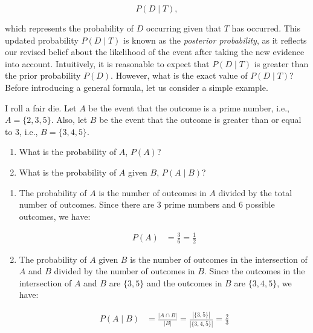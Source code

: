 \[
P(D \mid T),
\]

which represents the probability of \( D \) occurring given that \( T \) has occurred. This updated probability \( P(D \mid T) \) is known as the \textit{posterior probability}, as it reflects our revised belief about the likelihood of the event after taking the new evidence into account. Intuitively, it is reasonable to expect that \( P(D \mid T) \) is greater than the prior probability \( P(D) \). However, what is the exact value of \( P(D \mid T) \)? Before introducing a general formula, let us consider a simple example.

\begin{example}
I roll a fair die. Let \( A \) be the event that the outcome is a prime number, i.e., \( A = \{2, 3, 5\} \). Also, let \( B \) be the event that the outcome is greater than or equal to 3, i.e., \( B = \{3, 4, 5\} \).

\begin{enumerate}[label=(\alph*)]
    \item What is the probability of \( A \), \( P(A) \)?
    \item What is the probability of \( A \) given \( B \), \( P(A \mid B) \)?
\end{enumerate}

\end{example}

\begin{solution}
    \begin{enumerate}[label=(\alph*)]
        \item The probability of \( A \) is the number of outcomes in \( A \) divided by the total number of outcomes. Since there are 3 prime numbers and 6 possible outcomes, we have:

        \begin{align*}
        P(A) &= \frac{3}{6} = \frac{1}{2}
        \end{align*}

        \item The probability of \( A \) given \( B \) is the number of outcomes in the intersection of \( A \) and \( B \) divided by the number of outcomes in \( B \). Since the outcomes in the intersection of \( A \) and \( B \) are \(\{3, 5\}\) and the outcomes in \( B \) are \(\{3, 4, 5\}\), we have: \vspace{0.4cm}

        \begin{align*}
        P(A \mid B) &=\frac{|A \cap B|}{|B|} = \frac{|\{3,5\}|}{|\{3,4, 5\}|} = \frac{2}{3}
        \end{align*}

    \end{enumerate}
\leavevmode\end{solution}

